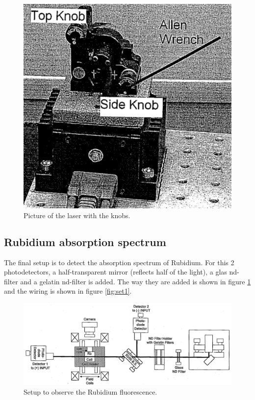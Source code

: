 \begin{figure}[H]
	\centering
	\includegraphics[width=\textwidth]{laser.png}
	\caption{Picture of the laser with the knobs. \cite{V60}}
	\end{figure}

\subsection{Rubidium absorption spectrum}
The final setup is to detect the absorption spectrum of Rubidium. For this 2 photodetectors, a half-transparent
mirror (reflects half of the light), a glas nd-filter and a gelatin nd-filter is added. The way they are added is 
shown in figure \ref{fig:sub} and the wiring is shown in figure \ref{fig:set1}.

\begin{figure}[H]
	\centering
	\includegraphics[width=\textwidth]{setup_substraction.png}
	\caption{Setup to observe the Rubidium fluorescence. \cite{V60}}
	\label{fig:sub}
\end{figure}

